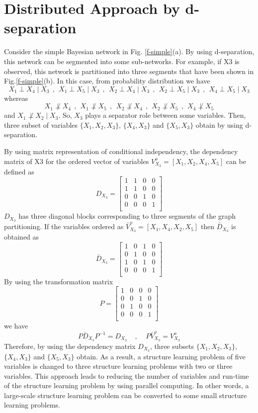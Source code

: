 \documentclass{article}
\begin{document}
\section{Distributed Approach by d-separation}
Consider the simple Bayesian network in Fig. \ref{f-simple}(a). By using d-separation, this network can be segmented into some sub-networks. For example, if X3 is observed, this network is partitioned into three segments that have been shown in Fig.\ref{f-simple}(b). In this case, from probability distribution we have
$$
    X_1 \perp X_4 \mid X_3~~,~~X_1 \perp X_5 \mid X_3~~,~~X_2 \perp X_4 \mid X_3~~,~~X_2 \perp X_5 \mid X_3~~,~~X_4 \perp X_5 \mid X_3
$$
whereas 
$$
    X_1 \not\perp X_4~~, ~~X_1\not \perp X_5~~, ~~X_2 \not\perp X_4~~, ~~X_2\not \perp X_5~~, ~~X_4\not \perp X_5
$$
and $X_1\not \perp X_2 \mid X_3$. So, $X_3$ plays a separator role between some variables. Then, three subset of variables $\{X_1,X_2,X_3\}$, $\{X_4,X_3\}$ and $\{X_5,X_3\}$ obtain by using d-separation. 

By using matrix representation of conditional independency, the dependency matrix of X3 for the ordered vector of variables $V^o_{X_3} = [X_1, X_2, X_4, X_5]$ can be defined as
$$
D_{X_3} = \left[{\begin{array}{*{20}{c}} 
1 & 1 & 0 & 0\\
1 & 1 & 0 & 0\\
0 & 0 & 1 & 0\\
0 & 0 & 0 & 1\\
\end{array}}\right]
$$
$D_{X_3}$ has three diagonal blocks corresponding to three segments of the graph partitioning. If the variables ordered as $\bar V^o_{X_3} = [X_1, X_4, X_2, X_5]$ then $\bar D_{X_3}$ is obtained as
$$
\bar D_{X_3} = \left[{\begin{array}{*{20}{c}} 
1 & 0 & 1 & 0\\
0 & 1 & 0 & 0\\
1 & 0 & 1 & 0\\
0 & 0 & 0 & 1\\
\end{array}}\right]
$$
By using the transformation matrix
$$
P = \left[{\begin{array}{*{20}{c}}
1 & 0 & 0 & 0\\
0 & 0 & 1 & 0\\
0 & 1 & 0 & 0\\
0 & 0 & 0 & 1\\
\end{array}}\right]
$$
we have 
\begin{equation}
    P\bar D_{X_3} P^{-1} = D_{X_3}~~~~~,~~~~~P\bar V^o_{X_3} = V^o_{X_3}
\end{equation}
Therefore, by using the dependency matrix $D_{X_3}$, three subsets $\{X_1,X_2,X_3\}$, $\{X_4,X_3\}$ and $\{X_5,X_3\}$ obtain. As a result, a structure learning problem of five variables is changed to three structure learning problems with two or three variables. This approach leads to reducing the number of variables and run-time of the structure learning problem by using parallel computing. In other words, a large-scale structure learning problem can be converted to some small structure learning problems.
\end{document}
